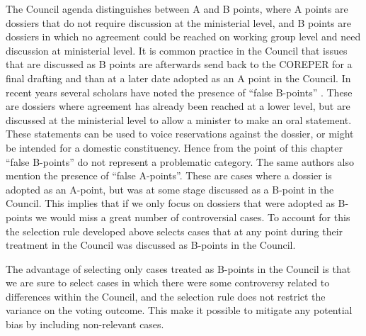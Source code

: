 The Council agenda distinguishes between A and B points, where A points are dossiers that do not require discussion at the ministerial level, and B points are dossiers in which no agreement could be reached on working group level and need discussion at ministerial level. It is common practice in the Council that issues that are discussed as B points are afterwards send back to the COREPER for a final drafting and than at a later date adopted as an A point in the Council. In recent years several scholars have noted the presence of ``false B-points'' \citep{Lewis1998,hage2008,Muehlbock2011}. These are dossiers where agreement has already been reached at a lower level, but are discussed at the ministerial level to allow a minister to make an oral statement. These statements can be used to voice reservations against the dossier, or might be intended for a domestic constituency. Hence from the point of this chapter ``false B-points'' do not represent a problematic category. The same authors also mention the presence of ``false A-points''. These are cases where a dossier is adopted as an A-point, but was at some stage discussed as a B-point in the Council. This implies that if we only focus on dossiers that were adopted as B-points we would miss a great number of controversial cases. To account for this the selection rule developed above selects cases that at any point during their treatment in the Council was discussed as B-points in the Council. 

The advantage of selecting only cases treated as B-points in the Council is that we are sure to select cases in which there were some controversy related to differences within the Council, and the selection rule does not restrict the variance on the voting outcome. This make it possible to mitigate any potential bias by including non-relevant cases. 

